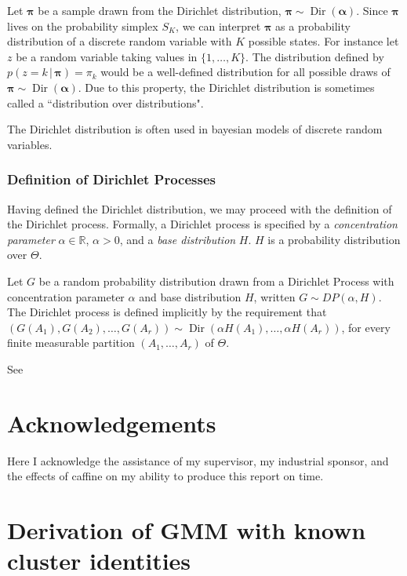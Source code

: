 \documentclass[final,3p,times,twocolumn]{elsarticle}
\DeclareMathOperator*{\Dir}{Dir}
\let\bs\boldsymbol
\begin{document}
Let $\bs \pi$ be a sample drawn from the Dirichlet distribution, $\bs \pi \sim \Dir(\bs \alpha)$.
Since $\bs \pi$ lives on the probability simplex $S_K$, we can interpret $\bs \pi$ as a probability distribution of a discrete random variable with $K$ possible states.
For instance let $z$ be a random variable taking values in $\{1, \dots, K\}$.
The distribution defined by $p(z = k \,|\, \bs \pi) = \pi_k$ would be a well-defined distribution for all possible draws of $\bs \pi \sim \Dir(\bs \alpha)$.
Due to this property, the Dirichlet distribution is sometimes called a ``distribution over distributions".

The Dirichlet distribution is often used in bayesian models of discrete random variables. 

\subsubsection{Definition of Dirichlet Processes}
Having defined the Dirichlet distribution, we may proceed with the definition of the Dirichlet process.
Formally, a Dirichlet process is specified by a \emph{concentration parameter} $\alpha \in \mathbb{R}$, $\alpha > 0$, and a \emph{base distribution} $H$.
$H$ is a probability distribution over $\Theta$.

Let $G$ be a random probability distribution drawn from a Dirichlet Process with concentration parameter $\alpha$ and base distribution $H$, written $G \sim DP(\alpha, H)$.
The Dirichlet process is defined implicitly by the requirement that $(G(A_1),G(A_2),\dots,G(A_r)) \sim \Dir(\alpha H(A_1),\dots, \alpha H(A_r))$, for every finite measurable partition $(A_1,\dots,A_r)$ of $\Theta$.

See \cite{Murphy}

\section*{Acknowledgements}
Here I acknowledge the assistance of my supervisor, my industrial sponsor,
and the effects of caffine on my ability to produce this report on time.

\appendix

\section{Derivation of GMM with known cluster identities}
\label{app:gmm}
\end{document}
